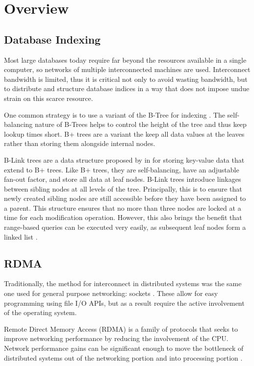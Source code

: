 \section{Overview}

\subsection{Database Indexing}
Most large databases today require far beyond the resources available in a single computer, so networks of multiple interconnected machines are used. Interconnect bandwidth is limited, thus it is critical not only to avoid wasting bandwidth, but to distribute and structure database indices in a way that does not impose undue strain on this scarce resource.

One common strategy is to use a variant of the B-Tree for indexing \cite{ma-tpds-2022}. The self-balancing nature of B-Trees helps to control the height of the tree and thus keep lookup times short. B+ trees are a variant the keep all data values at the leaves rather than storing them alongside internal nodes.

B-Link trees are a data structure proposed by \citeauthor{b-link} in \citeyear{b-link} for storing key-value data that extend to B+ trees. Like B+ trees, they are self-balancing, have an adjustable fan-out factor, and store all data at leaf nodes.
B-Link trees introduce linkages between sibling nodes at all levels of the tree. Principally, this is to ensure that newly created sibling nodes are still accessible before they have been assigned to a parent. This structure ensures that no more than three nodes are locked at a time for each modification operation. However, this also brings the benefit that range-based queries can be executed very easily, as subsequent leaf nodes form a linked list \cite{b-link}.


\subsection{RDMA}

Traditionally, the method for interconnect in distributed systems was the same one used for general purpose networking: sockets \cite{binnig-vldb-2016}. These allow for easy programming using file I/O APIs, but as a result require the active involvement of the operating system.

Remote Direct Memory Access (RDMA) is a family of protocols that seeks to improve networking performance by reducing the involvement of the CPU. Network performance gains can be significant enough to move the bottleneck of distributed systems out of the networking portion and into processing portion \cite{binnig-vldb-2016}.

